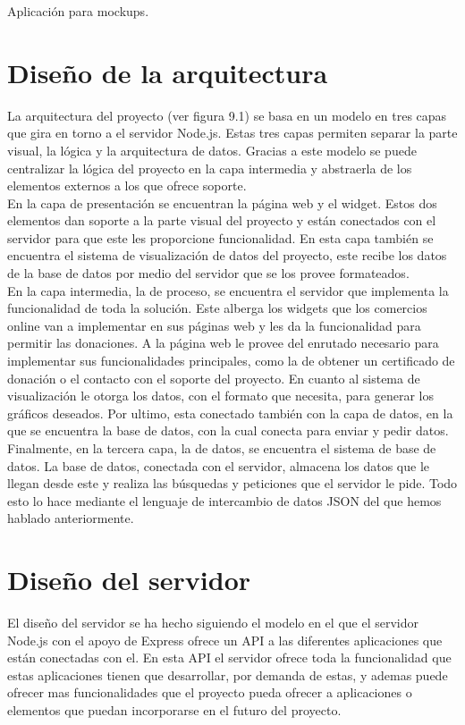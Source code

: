 Aplicación para mockups.

\section{Diseño de la arquitectura}
La arquitectura del proyecto (ver figura 9.1) se basa en un modelo en tres capas que gira en torno a el servidor Node.js. Estas tres capas permiten separar la parte visual, la lógica y la arquitectura de datos. Gracias a este modelo se puede centralizar la lógica del proyecto en la capa intermedia y abstraerla de los elementos externos a los que ofrece soporte.\\

En la capa de presentación se encuentran la página web y el widget. Estos dos elementos dan soporte a la parte visual del proyecto y están conectados con el servidor para que este les proporcione funcionalidad. En esta capa también se encuentra el sistema de visualización de datos del proyecto, este recibe los datos de la base de datos por medio del servidor que se los provee formateados.\\

En la capa intermedia, la de proceso, se encuentra el servidor que implementa la funcionalidad de toda la solución. Este alberga los widgets que los comercios online van a implementar en sus páginas web y les da la funcionalidad para permitir las donaciones. A la página web le provee del enrutado necesario para implementar sus funcionalidades principales, como la de obtener un certificado de donación o el contacto con el soporte del proyecto. En cuanto al sistema de visualización le otorga los datos, con el formato que necesita, para generar los gráficos deseados. Por ultimo, esta conectado también con la capa de datos, en la que se encuentra la base de datos, con la cual conecta para enviar y pedir datos.\\

Finalmente, en la tercera capa, la de datos, se encuentra el sistema de base de datos. La base de datos, conectada con el servidor, almacena los datos que le llegan desde este y realiza las búsquedas y peticiones que el servidor le pide. Todo esto lo hace mediante el lenguaje de intercambio de datos JSON del que hemos hablado anteriormente.


\section{Diseño del servidor}
El diseño del servidor se ha hecho siguiendo el modelo en el que el servidor Node.js con el apoyo de Express ofrece un API a las diferentes aplicaciones que están conectadas con el. En esta API el servidor ofrece toda la funcionalidad que estas aplicaciones tienen que desarrollar, por demanda de estas, y ademas puede ofrecer mas funcionalidades que el proyecto pueda ofrecer a aplicaciones o elementos que puedan incorporarse en el futuro del proyecto.\\

